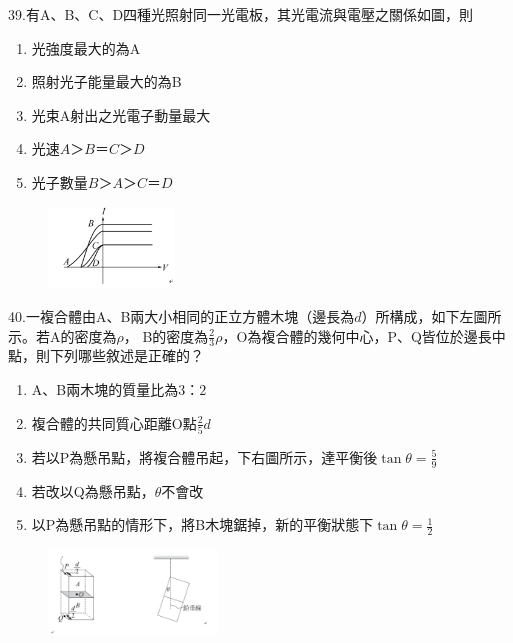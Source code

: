 \documentclass[cn,10pt,math=newtx]{elegantbook}
\begin{document}
\begin{example}
   39.有A、B、C、D四種光照射同一光電板，其光電流與電壓之關係如圖，則　
   \begin{enumerate}[label=(\Alph*)]
     \item 光強度最大的為A
     \item 照射光子能量最大的為B
     \item 光束A射出之光電子動量最大
     \item 光速$A＞B＝C＞D$
     \item 光子數量$B＞A＞C＝D$
   \end{enumerate}

    \rightline{[成德高中教甄109]}
\end{example}
\begin{solution}
    
\end{solution}
\begin{figure}[htbp]
    \flushright
    \includegraphics[width=0.3\textwidth]{image/109成德39.png}
  \end{figure}
\newpage



\begin{example}
   	40.一複合體由A、B兩大小相同的正立方體木塊（邊長為$d$）所構成，如下左圖所示。若A的密度為$\rho$，
     B的密度為$\frac{2}{3}\rho$，O為複合體的幾何中心，P、Q皆位於邊長中點，則下列哪些敘述是正確的？
     \begin{enumerate}[label=(\Alph*)]
       \item A、B兩木塊的質量比為$3：2$
       \item 複合體的共同質心距離O點$\frac{2}{5}d$
       \item 若以P為懸吊點，將複合體吊起，下右圖所示，達平衡後$\tan{\theta} = \frac{5}{9}$
       \item 若改以Q為懸吊點，$\theta$不會改
       \item 以P為懸吊點的情形下，將B木塊鋸掉，新的平衡狀態下$\tan{\theta} = \frac{1}{2}$
     \end{enumerate}

    \rightline{[成德高中教甄109]}
\end{example}
\begin{solution}
    
\end{solution}
\begin{figure}[htbp]
    \flushright
    \includegraphics[width=0.4\textwidth]{image/109成德40.png}
  \end{figure}
\newpage
\end{document}
